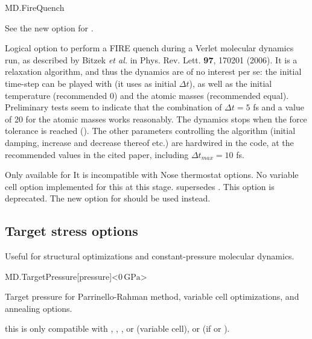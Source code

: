 \begin{fdflogicalF}{MD.FireQuench}
  
  See the new option  for .

  Logical option to perform a FIRE quench during a Verlet molecular
  dynamics run, as described by Bitzek \textit{et al.} in
  Phys. Rev. Lett. \textbf{97}, 170201 (2006). It is a relaxation
  algorithm, and thus the dynamics are of no interest per se: the
  initial time-step can be played with (it uses
   as initial $\Delta t$), as well as the
  initial temperature (recommended 0) and the atomic masses
  (recommended equal). Preliminary tests seem to indicate that the
  combination of $\Delta t = 5$ fs and a value of 20 for the atomic
  masses works reasonably. The dynamics stops when the force tolerance
  is reached (). The other parameters
  controlling the algorithm (initial damping, increase and decrease
  thereof etc.) are hardwired in the code, at the recommended values
  in the cited paper, including $\Delta t_{max} = 10$ fs.

  Only available for  
  It is incompatible with Nose thermostat options. No variable
  cell option implemented for this at this stage.
   supersedes . This option is
  deprecated. The new option  for  should be
  used instead.

\end{fdflogicalF}


\fi


\subsection{Target stress options}

Useful for structural optimizations and constant-pressure molecular
dynamics.

\begin{fdfentry}{MD.TargetPressure}[pressure]<$0\,\mathrm{GPa}$>
  
  Target pressure for Parrinello-Rahman method, variable cell
  optimizations, and annealing options.

  \note this is only compatible with 
   , ,
  ,  or  (variable cell), or 
  (if   or ).
  
\end{fdfentry}


